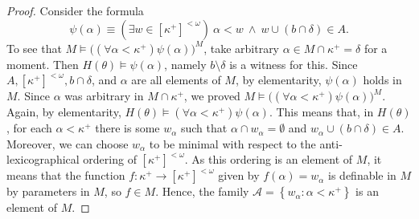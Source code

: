 \documentclass{amsart}
\theoremstyle{plain}
\theoremstyle{definition}
\numberwithin{equation}{section}
\renewcommand{\a}{\alpha}
\renewcommand{\d}{\delta}
\renewcommand{\k}{\kappa}
\renewcommand{\o}{\omega}
\newcommand{\ps}{\emptyset}
\newcommand{\set}[1]{\left\{#1\right\}}
\begin{document}
\begin{proof}
	Consider the formula $$\psi(\a)\equiv \left(\exists w\in [\k^+]^{<\o}\right)\ \a<w\ \wedge\ w\cup (b\cap \d)\in A.$$
	To see that $M\models \big((\forall \a<\k^+)\psi(\a)\big)^M$, take arbitrary $\a\in M\cap \k^+=\d$ for a moment.
	Then $H(\theta)\models \psi(\a)$, namely $b\setminus \d$ is a witness for this.
	Since $A,[\k^+]^{<\o},b\cap\d$, and $\a$ are all elements of $M$, by elementarity, $\psi(\a)$ holds in $M$.
	Since $\a$ was arbitrary in $M\cap \k^+$, we proved $M\models \big((\forall \a<\k^+)\psi(\a)\big)^M$.
	Again, by elementarity, $H(\theta)\models (\forall \a<\k^+)\psi(\a)$.
	This means that, in $H(\theta)$, for each $\a<\k^+$ there is some $w_{\a}$ such that $\a\cap w_{\a}=\ps$ and $w_{\a}\cup (b\cap\d)\in A$.
	Moreover, we can choose $w_{\a}$ to be minimal with respect to the anti-lexicographical ordering of $[\k^+]^{<\o}$.
	As this ordering is an element of $M$, it means that the function $f:\k^+\to [\k^+]^{<\o}$ given by $f(\a)=w_{\a}$ is definable in $M$ by parameters in $M$, so $f\in M$.
	Hence, the family $\mathcal A=\set{w_{\a}:\a<\k^+}$ is an element of $M$.


\end{proof}
\end{document}
